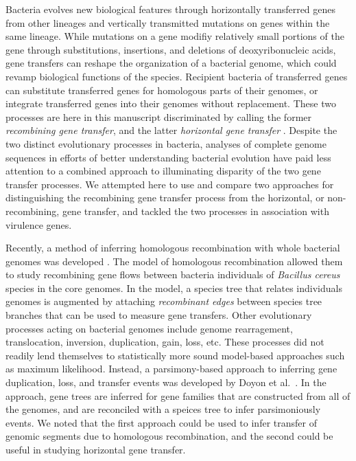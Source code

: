 \documentclass[10pt]{article}
\let\citep\cite
\let\citet\cite
\begin{document}
Bacteria evolves new biological features through horizontally transferred genes
from other lineages and vertically transmitted mutations on genes within the
same lineage.  While mutations on a gene modifiy relatively small portions of the 
gene through substitutions, insertions, and deletions of deoxyribonucleic acids,
gene transfers can reshape the organization of a bacterial genome,
which could revamp biological functions of the species.  Recipient bacteria of
transferred genes can substitute transferred genes for homologous parts of their
genomes, or integrate transferred genes into their genomes without replacement.
These two processes are here in this manuscript discriminated by calling the
former \textit{recombining gene transfer}, and the latter \textit{horizontal
gene transfer} \citep{Ochman2001,Lawrence2009}.  Despite the two distinct
evolutionary processes in bacteria, analyses of complete genome sequences in
efforts of better understanding bacterial evolution have paid less attention to
a combined approach to illuminating disparity of the two gene transfer
processes. We attempted here to use and compare two approaches for
distinguishing the recombining gene transfer process from the horizontal, or
non-recombining, gene transfer, and tackled the two processes in association with
virulence genes.

Recently, a method of inferring homologous recombination with whole bacterial
genomes was developed \citep{Didelot2010}. The model of homologous recombination
allowed them to study recombining gene flows between bacteria individuals of
\textit{Bacillus cereus} species in the core genomes.   In the model, a species
tree that relates individuals genomes is augmented by attaching
\textit{recombinant edges} between species tree branches that can be used to
measure gene transfers.  Other evolutionary processes acting on bacterial
genomes include genome rearragement, translocation, inversion, duplication,
gain, loss, etc.  These processes did not readily lend themselves to
statistically more sound model-based approaches such as maximum likelihood.
Instead, a parsimony-based approach to inferring gene duplication, loss, and
transfer events was developed by Doyon et al.\ \citet{Doyon2011}.  In the
approach, gene trees are inferred for gene families that are constructed from
all of the genomes, and are reconciled with a speices tree to infer
parsimoniously events.  We noted that the first approach could be used to infer
transfer of genomic segments due to homologous recombination, and the second
could be useful in studying horizontal gene transfer.
\end{document}

